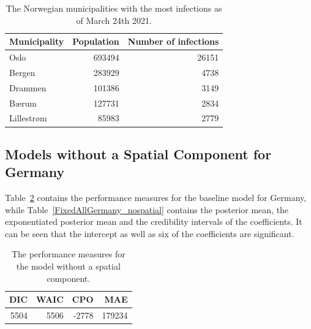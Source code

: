 \begin{table}[H] 
\caption{The Norwegian municipalities with the most infections as of March 24th 2021. \label{top5norway}}
\begin{tabular}{l r r}
\toprule
\textbf{Municipality}	& \textbf{Population}	& \textbf{Number of infections} \\
\midrule
Oslo & 693494 & 26151 \\
Bergen & 283929 & 4738 \\
Drammen & 101386 & 3149 \\
Bærum & 127731 & 2834 \\
Lillestrøm & 85983 & 2779 \\
\bottomrule
\end{tabular}
\end{table}
\subsection{Models without a Spatial Component for Germany}\label{sec:nospatial_germany}
Table~\ref{allGermany_nospatial} contains the performance measures for the baseline model for Germany, while Table~\ref{FixedAllGermany_nospatial} contains the posterior mean, the exponentiated posterior mean and the credibility intervals of the coefficients. It can be seen that the intercept as well as six of the coefficients are significant.
\begin{table}[H] 
\caption{The performance measures for the model without a spatial component. \label{allGermany_nospatial}}
\begin{tabular}{r r r r}
\toprule
\textbf{DIC}	& \textbf{WAIC} & \textbf{CPO} & \textbf{MAE}\\
\midrule
5504 & 5506 & -2778 &  179234 \\
\bottomrule
\end{tabular}
\end{table}
